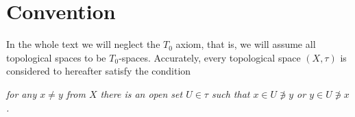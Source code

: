 \section*{Convention}

In the whole text we will neglect the $T_0$ axiom, that is, we will assume all
topological spaces to be $T_0$-spaces.
Accurately, every topological space $(X, \tau)$ is considered to hereafter
satisfy the condition
\begin{center} \it
  for any $x \ne y$ from $X$ there is an open set $U \in \tau$ such that $x \in U
  \not\owns y$ or $y \in U \not\owns x$.
\end{center}
